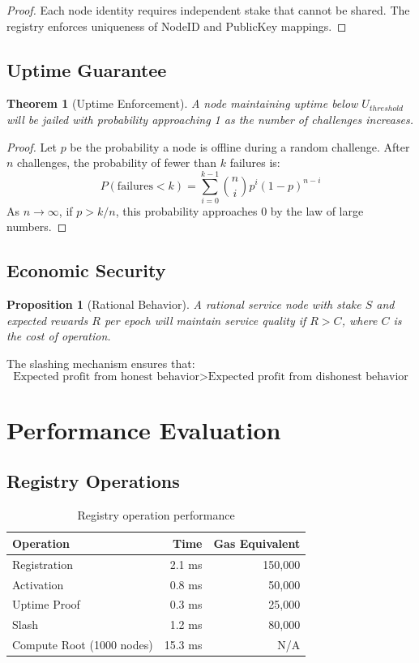 \documentclass[11pt,a4paper]{article}
\newtheorem{theorem}{Theorem}
\newtheorem{proposition}{Proposition}
\begin{document}
\begin{proof}
Each node identity requires independent stake that cannot be shared. The registry enforces uniqueness of NodeID and PublicKey mappings.
\end{proof}

\subsection{Uptime Guarantee}

\begin{theorem}[Uptime Enforcement]
A node maintaining uptime below $U_{threshold}$ will be jailed with probability approaching 1 as the number of challenges increases.
\end{theorem}

\begin{proof}
Let $p$ be the probability a node is offline during a random challenge. After $n$ challenges, the probability of fewer than $k$ failures is:
\[
P(\text{failures} < k) = \sum_{i=0}^{k-1} \binom{n}{i} p^i (1-p)^{n-i}
\]
As $n \to \infty$, if $p > k/n$, this probability approaches 0 by the law of large numbers.
\end{proof}

\subsection{Economic Security}

\begin{proposition}[Rational Behavior]
A rational service node with stake $S$ and expected rewards $R$ per epoch will maintain service quality if $R > C$, where $C$ is the cost of operation.
\end{proposition}

The slashing mechanism ensures that:
\[
\text{Expected profit from honest behavior} > \text{Expected profit from dishonest behavior}
\]

\section{Performance Evaluation}

\subsection{Registry Operations}

\begin{table}[h]
\centering
\begin{tabular}{lrr}
\toprule
\textbf{Operation} & \textbf{Time} & \textbf{Gas Equivalent} \\
\midrule
Registration & 2.1 ms & 150,000 \\
Activation & 0.8 ms & 50,000 \\
Uptime Proof & 0.3 ms & 25,000 \\
Slash & 1.2 ms & 80,000 \\
Compute Root (1000 nodes) & 15.3 ms & N/A \\
\bottomrule
\end{tabular}
\caption{Registry operation performance}
\end{table}
\end{document}
